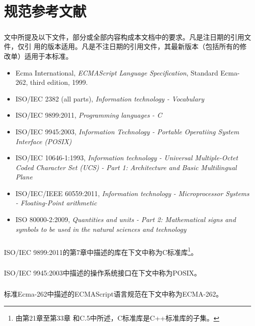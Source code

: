 \chapter{规范参考文献}
\paragraph{}
文中所提及以下文件，部分或全部内容构成本文档中的要求。凡是注日期的引用文件，仅引
用的版本适用。凡是不注日期的引用文件，其最新版本（包括所有的修改单）适用于本标准。
\begin{itemize}
  \item Ecma International, \textit{ECMAScript Language Specification}, Standard
    Ecma-262, third edition, 1999.
  \item ISO/IEC 2382 (all parts), \textit{Information technology - Vocabulary}
  \item ISO/IEC 9899:2011, \textit{Programming languages - C}
  \item ISO/IEC 9945:2003, \textit{Information Technology - Portable Operatiing
    System Interface (POSIX)}
  \item ISO/IEC 10646-1:1993, \textit{Information technology - Universal
      Multiple-Octet Coded Character Set (UCS) - Part 1: Architecture and Basic
    Multilingual Plane}
  \item ISO/IEC/IEEE 60559:2011, \textit{Information technology - Microprocessor
    Systems - Floating-Point arithmetic}
  \item ISO 80000-2:2009, \textit{Quantities and units - Part 2: Mathematical
    signs and symbols to be used in the natural sciences and technology}
\end{itemize}

\paragraph{}
ISO/IEC 9899:2011的第7章中描述的库在下文中称为C标准库\footnote{由第21章至第33章
和C.5中所述，C标准库是C++标准库的子集。}。

\paragraph{}
ISO/IEC 9945:2003中描述的操作系统接口在下文中称为POSIX。

\paragraph{}
标准Ecma-262中描述的ECMAScript语言规范在下文中称为ECMA-262。

